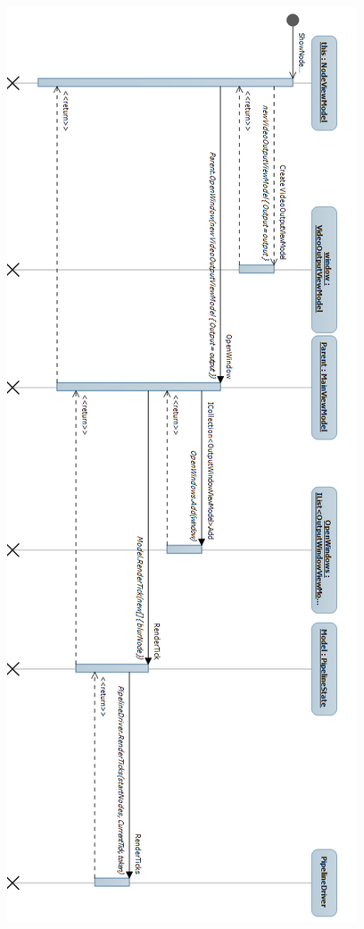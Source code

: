 \begin{figure}[h!]
\begin{center}
\includegraphics[height=0.9\textheight]{Diagrams/shownodeoutput.png}
\end{center}
\end{figure}
\newpage

